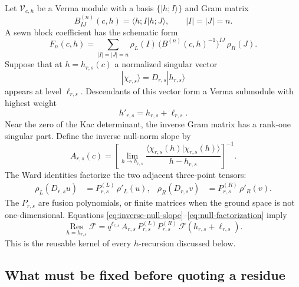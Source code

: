\documentclass[11pt]{article}
\newcommand{\F}{\mathcal F}
\newcommand{\Res}{\operatorname*{Res}}
\begin{document}
Let \(\mathcal V_{c,h}\) be a Verma module with a basis
\(\{|h;I\rangle\}\) and Gram matrix
\begin{equation}
 B^{(n)}_{IJ}(c,h)=\langle h;I|h;J\rangle ,
 \qquad |I|=|J|=n .
\end{equation}
A sewn block coefficient has the schematic form
\begin{equation}
 F_n(c,h)
 =
 \sum_{|I|=|J|=n}
 \rho_L(I)\,
 \big(B^{(n)}(c,h)^{-1}\big)^{IJ}\,
 \rho_R(J).
 \label{eq:gram-definition}
\end{equation}
Suppose that at \(h=h_{r,s}(c)\) a normalized singular vector
\begin{equation}
 |\chi_{r,s}\rangle
 =
 D_{r,s}|h_{r,s}\rangle
\end{equation}
appears at level \(\ell_{r,s}\).  Descendants of this vector form a Verma
submodule with highest weight
\begin{equation}
 h'_{r,s}=h_{r,s}+\ell_{r,s}.
\end{equation}
Near the zero of the Kac determinant, the inverse Gram matrix has a
rank-one singular part.  Define the inverse null-norm slope by
\begin{equation}
 A_{r,s}(c)
 =
 \left[
 \lim_{h\to h_{r,s}}
 \frac{\langle\chi_{r,s}(h)|\chi_{r,s}(h)\rangle}
      {h-h_{r,s}}
 \right]^{-1}.
 \label{eq:inverse-null-slope}
\end{equation}
The Ward identities factorize the two adjacent three-point tensors:
\begin{align}
 \rho_L(D_{r,s}u)
 &=P^{(L)}_{r,s}\,\rho'_L(u),&
 \rho_R(D_{r,s}v)
 &=P^{(R)}_{r,s}\,\rho'_R(v).
 \label{eq:null-factorization}
\end{align}
The \(P_{r,s}\) are fusion polynomials, or finite matrices when the ground
space is not one-dimensional.  Equations
\eqref{eq:inverse-null-slope}--\eqref{eq:null-factorization} imply
\begin{equation}
 \Res_{h=h_{r,s}}\F
 =
 q^{\ell_{r,s}}\,
 A_{r,s}\,
 P^{(L)}_{r,s}P^{(R)}_{r,s}\,
 \F(h_{r,s}+\ell_{r,s}).
 \label{eq:universal-residue}
\end{equation}
This is the reusable kernel of every \(h\)-recursion discussed below.

\subsection{What must be fixed before quoting a residue}
\end{document}
